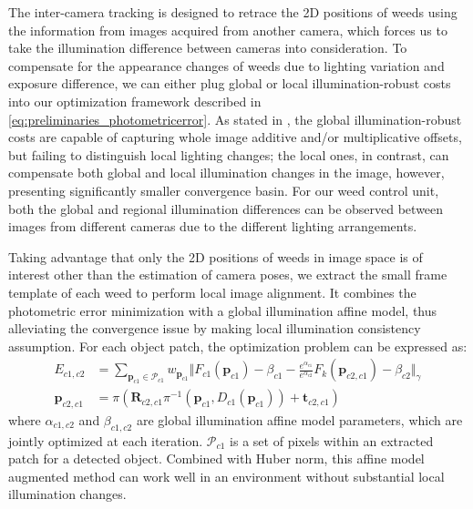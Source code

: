 The inter-camera tracking is designed to retrace the 2D positions of weeds using the information from images acquired from another camera, which forces us to take the illumination difference between cameras into consideration. 
To compensate for the appearance changes of weeds due to lighting variation and exposure difference, we can either plug global or local illumination-robust costs into our optimization framework described in \ref{eq:preliminaries_photometricerror}.
As stated in \cite{park2017illumination}, the global illumination-robust costs are capable of capturing whole image additive and/or multiplicative offsets, but failing to distinguish local lighting changes; the local ones, in contrast, can compensate both global and local illumination changes in the image, however, presenting significantly smaller convergence basin. 
For our weed control unit, both the global and regional illumination differences can be observed between images from different cameras due to the different lighting arrangements. 

Taking advantage that only the 2D positions of weeds in image space is of interest other than the estimation of camera poses, we extract the small frame template of each weed to perform local image alignment.
It combines the photometric error minimization with a global illumination affine model, thus alleviating the convergence issue by making local illumination consistency assumption.
For each object patch, the optimization problem can be expressed as:
\begin{equation} \label{eq:agrirobotics_affine}
\begin{split}
E_{c1,c2} &=  \sum_{\mathbf{p}_{c1} \in \mathcal{P}_{c1} } w_{\mathbf{p}_{c1}} \Vert F_{c1}(\mathbf{p}_{c1}) - \beta_{c1} - \frac{e^{\alpha_{c1}}}{e^{\alpha_{c2}}} F_k(\mathbf{p}_{c2,c1}) -\beta_{c2} \Vert_{\gamma} \\
 \mathbf{p}_{c2,c1} &=  \pi ( \mathbf{R}_{c2,c1}\pi^{-1}(\mathbf{p}_{c1},D_{c1}(\mathbf{p}_{c1}) )+\mathbf{t}_{c2,c1} )
\end{split} 
\end{equation}
where $\alpha_{c1,c2}$ and $\beta_{c1,c2}$ are global illumination affine model parameters, which are jointly optimized at each iteration. $\mathcal{P}_{c1}$ is a set of pixels within an extracted patch for a detected object. Combined with Huber norm, this affine model augmented method can work well in an environment without substantial local illumination changes.
 
